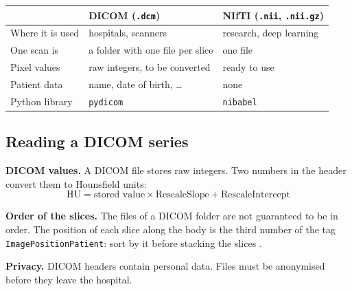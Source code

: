 \documentclass[11pt,a4paper]{article}
\newcommand{\code}[1]{\texttt{\small #1}}
\begin{document}
\begin{center}
\begin{tabular}{@{}p{3.2cm}p{5.6cm}p{5.6cm}@{}}
\toprule
 & DICOM (\code{.dcm}) & NIfTI (\code{.nii}, \code{.nii.gz}) \\
\midrule
Where it is used & hospitals, scanners & research, deep learning \\
One scan is & a folder with one file per slice & one file \\
Pixel values & raw integers, to be converted & ready to use \\
Patient data & name, date of birth, \dots & none \\
Python library & \code{pydicom} & \code{nibabel} \\
\bottomrule
\end{tabular}
\end{center}

\begin{center}
\end{center}

\subsection{Reading a DICOM series}

\textbf{DICOM values.} A DICOM file stores raw integers. Two numbers in the header convert them to Hounsfield
units:
\[
\mathrm{HU} = \text{stored value} \times \text{RescaleSlope} + \text{RescaleIntercept}
\]

\textbf{Order of the slices.} The files of a DICOM folder are not guaranteed to be in order. The position of
each slice along the body is the third number of the tag \code{ImagePositionPatient}: sort by it before
stacking the slices \cite{dicomstandard}.

\textbf{Privacy.} DICOM headers contain personal data. Files must be anonymised before they leave the hospital.
\end{document}
